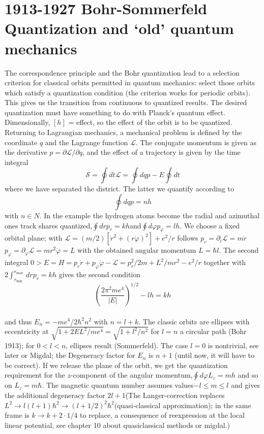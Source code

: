 \section{1913-1927 Bohr-Sommerfeld Quantization and `old' quantum mechanics}
The correspondence principle and the Bohr quantization lead to a selection criterion for classical orbits permitted in quantum mechanics: select those orbits which satisfy a quantization condition (the criterion works for periodic orbits). This gives us the transition from continuous to quantized results. The desired quantization must have something to do with Planck's quantum effect. Dimensionally, $[h]$ = effect, so the effect of the orbit is to be quantized. Returning to Lagrangian mechanics, a mechanical problem is defined by the coordinate $q$ and the Lagrange function $\mathcal{L}$. The conjugate momentum is given as the derivative $p = \partial \mathcal{L}/\partial q$, and the effect of a trajectory is given by the time integral
\begin{equation}
\mathcal{S}=\oint d t \mathcal{L}=\oint d q p-E \oint d t
\end{equation}
where we have separated the district. The latter we quantify according to
\begin{equation}
\oint d q p=n h
\end{equation}
with $n \in N$. In the example the hydrogen atoms become the radial and azimuthal ones track shares quantized,$\oint d r p_{r}=k h$and$\oint d \varphi p_{\varphi}=l h$. We choose
a fixed orbital plane; with $\mathcal{L}=(m / 2)\left[\dot{r}^{2}+(r \dot{\varphi})^{2}\right]+e^{2} / r$ follows $p_{r}=\partial_{i} \mathcal{L}=m \dot{r} $ $p_{\varphi}=\partial_{\dot{\varphi}} \mathcal{L}=m r^{2} \dot{\varphi}=L $ with the obtained angular momentum $L=\hbar l$.
The second integral $0>E=H=p_{r} \dot{r}+p_{\varphi} \dot{\varphi}-\mathcal{L}=p_{r}^{2} / 2 m+L^{2} / m r^{2}-e^{2} / r $ together with $2 \int_{r_{\text {min }}}^{r_{\text {max }}} d r p_{r}=k h$ gives the second condition
\\
\begin{equation}
\left(\frac{2 \pi^{2} m e^{4}}{|E|}\right)^{1 / 2}-l h=k h
\end{equation}
\\
and thus $E_n=-me^4/2\hbar^2n^2$  with $n = l + k$. The classic orbits are ellipses with eccentricity at
$\sqrt{1+2 E L^{2} / m e^{4}}=\sqrt{1+l^{2} / n^{2}}$ for $l = n$
a circular path (Bohr 1913); for $ 0 <l <n$, ellipses result
(Sommerfeld). The case $ l = 0 $ is nontrivial, see later or Migdal; the Degeneracy factor for $E_n$ is $n + 1$ (until now, it will have to be correct). If we release the plane of the orbit, we get the quantization requirement for the $z$-component of the angular momentum,$\oint d \varphi L_{z}=m h$ and so on $L_z = m\hbar$. The magnetic quantum number assumes values ​​$-l \leq m \leq l$ and gives the additional degeneracy factor $2l + 1$(The Langer-correction replaces $L^2\to l(l+1)\hbar^2\to (l+1/2)^2\hbar^2$(quasi-classical approximation); in the same frame is $k\to k+2\cdot 1/4$ to replace, a consequence of reexpression at the local linear potential, see chapter 10 about quasiclassical methods or migdal.)

